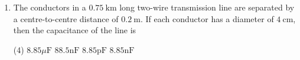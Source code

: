 \begin{enumerate} [label=\color{ocre}\textbf{\arabic*.}]
\begin{answer}
\begin{align*}
		d k&=\alpha d x \\
		k&=\alpha x+\beta\\
		\text{Now, at }x&=0, k=k_{1}\text{ and at $x={d}, k=k_{2}$}\\
		k&=\frac{\left(k_{2}-k_{1}\right) x}{d}+k_{1}\\
		\text{Now the the field}&\text{ at $P$ is}\\
		E &=\frac{\sigma}{\varepsilon}=\frac{\sigma}{\varepsilon_{0} k}=\frac{\sigma}{\varepsilon_{0}\left[\frac{\left(k_{2}-k_{1}\right) x}{d}+k_{1}\right]} \\
		V &=-\int_{d}^{0} E d x=\frac{\sigma}{\varepsilon_{0}} \int_{0}^{d} \frac{d x}{\left.\left(k_{2}-k_{1}\right) x_{1}\right)_{1}} \frac{\sigma_{1}}{d} \\
		&=\left.\frac{\sigma d}{\varepsilon_{0}\left(k_{2}-k_{1}\right)} \ln \left(\frac{k_{2}-k_{1}}{d} x+k_{1}\right)\right|_{0} ^{d}\\
		&=\frac{\sigma d}{\varepsilon_{0}\left(k_{2}-k_{1}\right)} \ln \left(\frac{k_{2}-k_{1}+k_{1}}{k_{1}}\right)\\
		&=\frac{Q d}{\varepsilon_{0} A\left(k_{2}-k_{1}\right)} \ln \left(\frac{k_{2}}{k_{1}}\right) \\
		c&=\frac{Q}{V}=\frac{\varepsilon_{0} A}{d} \frac{\left(k_{2}-k_{1}\right)}{\ln \left(k_{2} / k_{1}\right)}
		\end{align*}
	\end{answer}
	\item The conductors in a $0.75 \mathrm{~km}$ long two-wire transmission line are separated by a centre-to-centre distance of $0.2 \mathrm{~m}$. If each conductor has a diameter of $4 \mathrm{~cm}$, then the capacitance of the line is
	\begin{tasks}(4)
		\task[\textbf{a.}]$8.85 \mu \mathrm{F}$  
		\task[\textbf{b.}]$88.5 \mathrm{nF}$
		\task[\textbf{c.}]$8.85 \mathrm{pF}$ 
		\task[\textbf{d.}]$8.85 \mathrm{nF}$ 
	\end{tasks}
	

\end{enumerate}
